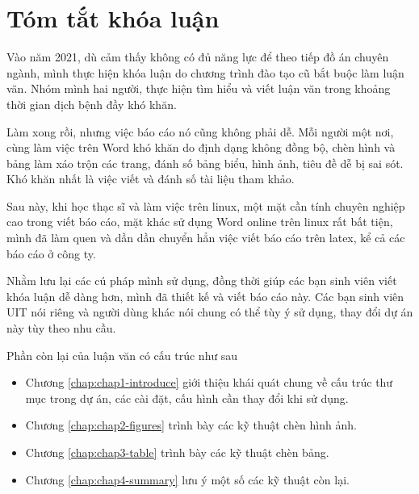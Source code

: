 \chapter*{\centering\Large{Tóm tắt khóa luận}}

Vào năm 2021, dù cảm thấy không có đủ năng lực để theo tiếp đồ án chuyên ngành, mình thực hiện khóa luận do chương trình đào tạo cũ bắt buộc làm luận văn. Nhóm mình hai người, thực hiện tìm hiểu và viết luận văn trong khoảng thời gian dịch bệnh đầy khó khăn.

Làm xong rồi, nhưng việc báo cáo nó cũng không phải dễ. Mỗi người một nơi, cùng làm việc trên Word khó khăn do định dạng không đồng bộ, chèn hình và bảng làm xáo trộn các trang, đánh số bảng biểu, hình ảnh, tiêu đề dễ bị sai sót. Khó khăn nhất là việc viết và đánh số tài liệu tham khảo.

Sau này, khi học thạc sĩ và làm việc trên linux, một mặt cần tính chuyên nghiệp cao trong viết báo cáo, mặt khác sử dụng Word online trên linux rất bất tiện, mình đã làm quen và dần dần chuyển hẳn việc viết báo cáo trên latex, kể cả các báo cáo ở công ty.

Nhằm lưu lại các cú pháp mình sử dụng, đồng thời giúp các bạn sinh viên viết khóa luận dễ dàng hơn, mình đã thiết kế và viết báo cáo này. Các bạn sinh viên UIT nói riêng và người dùng khác nói chung có thể tùy ý sử dụng, thay đổi dự án này tùy theo nhu cầu.

Phần còn lại của luận văn có cấu trúc như sau
\begin{itemize}
    \item Chương \ref{chap:chap1-introduce} giới thiệu khái quát chung về cấu trúc thư mục trong dự án, các cài đặt, cấu hình cần thay đổi khi sử dụng.
    \item Chương \ref{chap:chap2-figures} trình bày các kỹ thuật chèn hình ảnh.
    \item Chương \ref{chap:chap3-table} trình bày các kỹ thuật chèn bảng.
    \item Chương \ref{chap:chap4-summary} lưu ý một số các kỹ thuật còn lại.
\end{itemize}